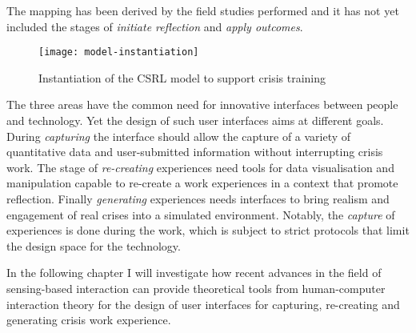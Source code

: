 The mapping has been derived by the field studies performed and it has not yet included the stages of \emph{initiate reflection} and \emph{apply outcomes}.

\begin{figure}
	[htb] \centering 
	\texttt{[image: model-instantiation]} \caption{Instantiation of the CSRL model to support crisis training} \label{fig:model-instantiation} 
\end{figure}

The three areas have the common need for innovative interfaces between people and technology. Yet the design of such user interfaces aims at different goals. During \emph{capturing} the interface should allow the capture of a variety of quantitative data and user-submitted information without interrupting crisis work. The stage of \emph{re-creating} experiences need tools for data visualisation and manipulation capable to re-create a work experiences in a context that promote reflection. Finally \emph{generating} experiences needs interfaces to bring realism and engagement of real crises into a simulated environment. Notably, the \emph{capture} of experiences is done during the work, which is subject to strict protocols that limit the design space for the technology.

In the following chapter I will investigate how recent advances in the field of sensing-based interaction can provide theoretical tools from human-computer interaction theory for the design of user interfaces for capturing, re-creating and generating crisis work experience. 
